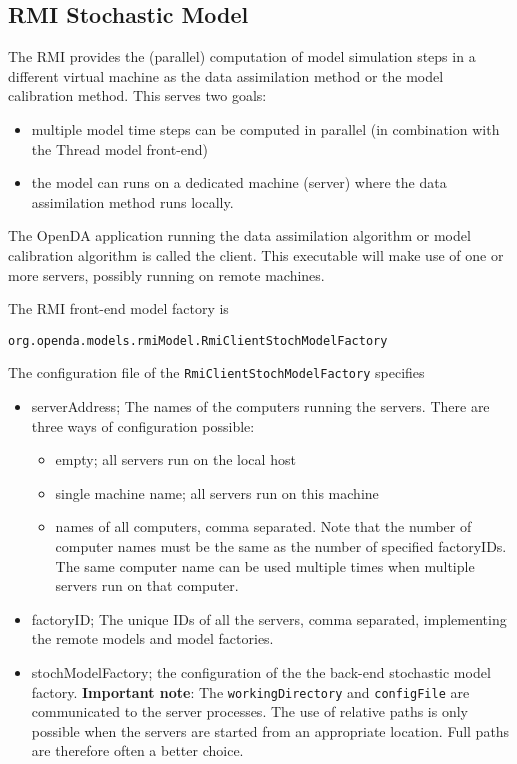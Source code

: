\documentclass[12pt]{article}
\begin{document}
\subsection{RMI Stochastic Model}
The RMI provides the (parallel) computation of model simulation steps in a different virtual machine as the data assimilation method or the model calibration method. This serves two goals:
\begin{itemize}
\item multiple model time steps can be computed in parallel (in combination with the Thread model front-end)
\item the model can runs on a dedicated machine (server) where the data assimilation method runs locally. 
\end{itemize}

The OpenDA application running the data assimilation algorithm or model calibration algorithm is called the client. This executable will make use of one or more servers, possibly running on remote machines.

The RMI front-end model factory is  
\begin{verbatim}
org.openda.models.rmiModel.RmiClientStochModelFactory
\end{verbatim}
The configuration file of the {\tt RmiClientStochModelFactory} specifies
\begin{itemize}
\item serverAddress; The names of the computers running the servers. There
         are three ways of configuration possible:
         \begin{itemize}
        \item empty; all servers run on the local host
        \item single machine name; all servers run on this machine
        \item names of all computers, comma separated. Note that the number of computer names
                 must be the same as the number of specified factoryIDs. The same computer name can
                 be used multiple times when multiple servers run on that computer. 
        \end{itemize}
\item  factoryID; The unique IDs of all the servers, comma separated, implementing the remote
           models and model factories. 
\item stochModelFactory; the configuration of the the back-end stochastic model factory. {\bf Important note}: The {\tt workingDirectory} and {\tt configFile} are communicated to the server processes. The use of relative paths is only possible when the servers are started from an appropriate location. Full paths are therefore often a better choice.                  
\end{itemize}
\end{document}
